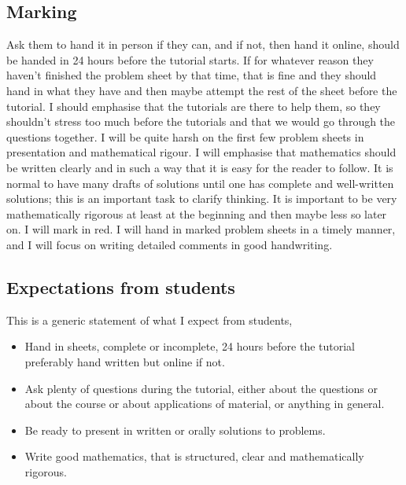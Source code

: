 \documentclass{article}
\begin{document}
\subsection{Marking}
Ask them to hand it in person if they can, and if not, then hand it online, should be handed in 24 hours before the tutorial starts.
If for whatever reason they haven't finished the problem sheet by that time, that is fine and they should hand in what they have and then maybe attempt the rest of the sheet before the tutorial.
I should emphasise that the tutorials are there to help them, so they shouldn't stress too much before the tutorials and that we would go through the questions together.
I will be quite harsh on the first few problem sheets in presentation and mathematical rigour.
I will emphasise that mathematics should be written clearly and in such a way that it is easy for the reader to follow.
It is normal to have many drafts of solutions until one has complete and well-written solutions; this is an important task to clarify thinking.
It is important to be very mathematically rigorous at least at the beginning and then maybe less so later on.
I will mark in red.
I will hand in marked problem sheets in a timely manner, and I will focus on writing detailed comments in good handwriting.
\subsection{Expectations from students}
This is a generic statement of what I expect from students,
\begin{itemize}
    \item Hand in sheets, complete or incomplete, 24 hours before the tutorial preferably hand written but online if not.
    \item Ask plenty of questions during the tutorial, either about the questions or about the course or about applications of material, or anything in general.
    \item Be ready to present in written or orally solutions to problems.
    \item Write good mathematics, that is structured, clear and mathematically rigorous.
\end{itemize}
\end{document}

